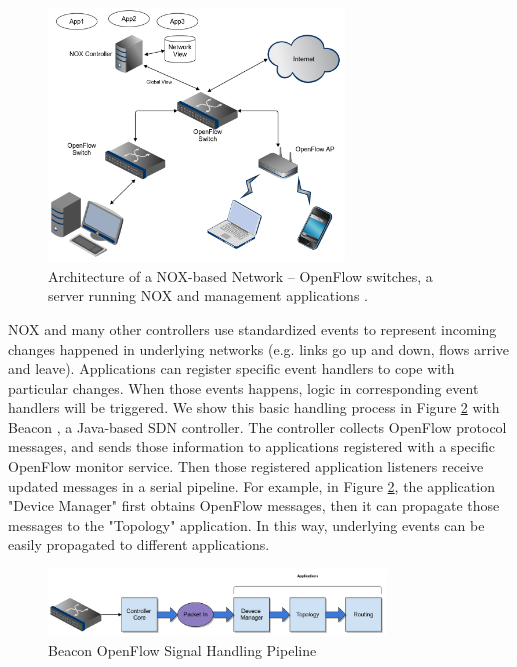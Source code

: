 \documentclass[english]{tktltiki}
\begin{document}
\begin{figure}[htbp]
  \centering
  \includegraphics[width=0.7\textwidth]{images/nox.png}
  \caption{Architecture of a NOX-based Network -- OpenFlow switches, a server running NOX and management applications \cite{gkp+08}.}
  \label{fig:nox}
\end{figure}

NOX and many other controllers use standardized events to represent incoming changes happened in underlying networks (e.g. links go up and down, flows arrive and leave). Applications can register specific event handlers to cope with particular changes. When those events happens, logic in corresponding event handlers will be triggered. We show this basic handling process in Figure \ref{fig:beacon} with Beacon \cite{eri13}, a Java-based SDN controller. The controller collects OpenFlow protocol messages, and sends those information to applications registered with a specific OpenFlow monitor service. Then those registered application listeners receive updated messages in a serial pipeline. For example, in Figure \ref{fig:beacon}, the application "Device Manager" first obtains OpenFlow messages, then it can propagate those messages to the "Topology" application. In this way, underlying events can be easily propagated to different applications.

\begin{figure}[htbp]
  \centering
  \includegraphics[width=0.8\textwidth]{images/beacon.png}
  \caption{Beacon OpenFlow Signal Handling Pipeline \cite{eri13}}
  \label{fig:beacon}
\end{figure}
\end{document}
